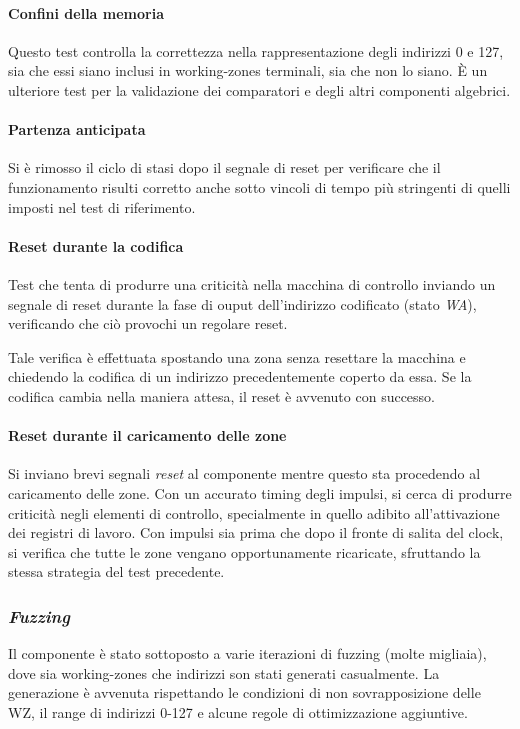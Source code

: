 \documentclass[11pt,a4paper]{article}
\begin{document}
\paragraph{Confini della memoria}
Questo test controlla la correttezza nella rappresentazione degli indirizzi 0 e 127, sia che essi siano inclusi in working-zones terminali, sia che non lo
siano. È un ulteriore test per la validazione dei comparatori e degli altri componenti algebrici.

\paragraph{Partenza anticipata}
Si è rimosso il ciclo di stasi dopo il segnale di reset per verificare che il funzionamento risulti corretto anche sotto vincoli di tempo più stringenti di
quelli imposti nel test di riferimento.

\paragraph{Reset durante la codifica}
Test che tenta di produrre una criticità nella macchina di controllo inviando un segnale di reset durante la fase di ouput dell'indirizzo codificato (stato
\emph{WA}), verificando che ciò provochi un regolare reset.

Tale verifica è effettuata spostando una zona senza resettare la macchina e chiedendo la codifica di un indirizzo precedentemente coperto da essa. Se la
codifica cambia nella maniera attesa, il reset è avvenuto con successo.

\paragraph{Reset durante il caricamento delle zone}
Si inviano brevi segnali \emph{reset} al componente mentre questo sta procedendo al caricamento delle zone. Con un accurato timing degli impulsi, si cerca
di produrre criticità negli elementi di controllo, specialmente in quello adibito all'attivazione dei registri di lavoro. Con impulsi sia prima che dopo
il fronte di salita del clock, si verifica che tutte le zone vengano opportunamente ricaricate, sfruttando la stessa strategia del test precedente.

\subsubsection{\emph{Fuzzing}}
Il componente è stato sottoposto a varie iterazioni di fuzzing (molte migliaia), dove sia working-zones che indirizzi son stati generati casualmente.
La generazione è avvenuta  rispettando le condizioni di non sovrapposizione delle WZ, il range di indirizzi 0-127 e alcune regole di ottimizzazione
aggiuntive.
\end{document}
